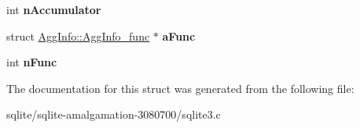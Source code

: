 \begin{DoxyCompactItemize}
\item 
\hypertarget{struct_agg_info_ad2251760d95af9024f0a3170405cb53b}{int {\bfseries n\+Accumulator}}\label{struct_agg_info_ad2251760d95af9024f0a3170405cb53b}

\item 
\hypertarget{struct_agg_info_a4e201acd6a1f8aed360c58e45f47c803}{struct \hyperlink{struct_agg_info_1_1_agg_info__func}{Agg\+Info\+::\+Agg\+Info\+\_\+func} $\ast$ {\bfseries a\+Func}}\label{struct_agg_info_a4e201acd6a1f8aed360c58e45f47c803}

\item 
\hypertarget{struct_agg_info_a5bfde7ca00d28da6edbda523ab038e38}{int {\bfseries n\+Func}}\label{struct_agg_info_a5bfde7ca00d28da6edbda523ab038e38}

\end{DoxyCompactItemize}


The documentation for this struct was generated from the following file\+:\begin{DoxyCompactItemize}
\item 
sqlite/sqlite-\/amalgamation-\/3080700/sqlite3.\+c\end{DoxyCompactItemize}
